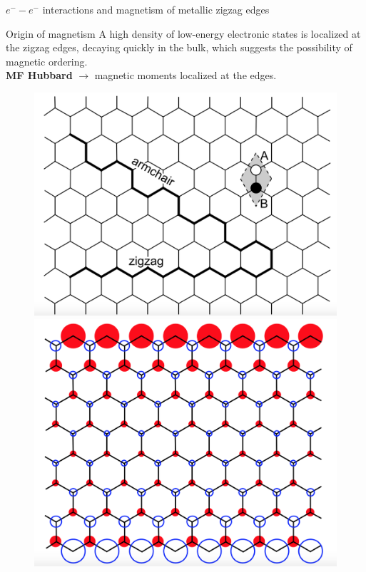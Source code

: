 \documentclass{beamer}
\begin{document}
	\begin{frame}{$e^- - e^-$ interactions and magnetism of metallic zigzag edges}
	\vspace{2mm}
	\begin{block}{Origin of magnetism}
       	A high density of low-energy electronic states is localized at the zigzag edges, decaying quickly in the bulk, which suggests the possibility of magnetic ordering.\\ \textbf{MF Hubbard} $\rightarrow$ magnetic moments localized at the edges.
      \end{block}	
	
	\begin{figure}[ht!]
	\hspace{-3.5cm}
\begin{minipage}[c]{0.1\textwidth}
\centering
\includegraphics[scale = 0.142]{zigzag}
\end{minipage} \hspace{4cm}
\begin{minipage}[c]{0.1\textwidth}
\includegraphics[scale = 0.148]{edge_states}

\end{minipage}
\end{figure}
\end{frame}
\end{document}
